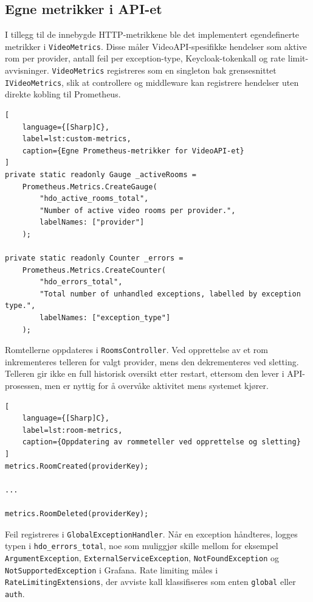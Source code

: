 \subsection{Egne metrikker i API-et}

I tillegg til de innebygde HTTP-metrikkene ble det implementert egendefinerte metrikker i \texttt{VideoMetrics}. Disse måler VideoAPI-spesifikke hendelser som aktive rom per provider, antall feil per exception-type, Keycloak-tokenkall og rate limit-avvisninger. \texttt{VideoMetrics} registreres som en singleton bak grensesnittet \texttt{IVideoMetrics}, slik at controllere og middleware kan registrere hendelser uten direkte kobling til Prometheus.

\begin{lstlisting}[
    language={[Sharp]C},
    label=lst:custom-metrics,
    caption={Egne Prometheus-metrikker for VideoAPI-et}
]
private static readonly Gauge _activeRooms =
    Prometheus.Metrics.CreateGauge(
        "hdo_active_rooms_total",
        "Number of active video rooms per provider.",
        labelNames: ["provider"]
    );

private static readonly Counter _errors =
    Prometheus.Metrics.CreateCounter(
        "hdo_errors_total",
        "Total number of unhandled exceptions, labelled by exception type.",
        labelNames: ["exception_type"]
    );
\end{lstlisting}

Romtellerne oppdateres i \texttt{RoomsController}. Ved opprettelse av et rom inkrementeres telleren for valgt provider, mens den dekrementeres ved sletting. Telleren gir ikke en full historisk oversikt etter restart, ettersom den lever i API-prosessen, men er nyttig for å overvåke aktivitet mens systemet kjører.

\begin{lstlisting}[
    language={[Sharp]C},
    label=lst:room-metrics,
    caption={Oppdatering av rommeteller ved opprettelse og sletting}
]
metrics.RoomCreated(providerKey);

...

metrics.RoomDeleted(providerKey);
\end{lstlisting}

Feil registreres i \texttt{GlobalExceptionHandler}. Når en exception håndteres, logges typen i \texttt{hdo\_errors\_total}, noe som muliggjør skille mellom for eksempel \texttt{ArgumentException}, \texttt{ExternalServiceException}, \texttt{NotFoundException} og \texttt{NotSupportedException} i Grafana. Rate limiting måles i \texttt{RateLimitingExtensions}, der avviste kall klassifiseres som enten \texttt{global} eller \texttt{auth}.

